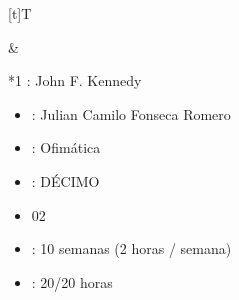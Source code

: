 \documentclass[letterpaper,10pt,spanish]{sphinxmanual}
\begin{document}
\begin{savenotes}\sphinxattablestart
\sphinxthistablewithglobalstyle
\centering
\begin{tabular}[t]{}
\sphinxtoprule
\sphinxtableatstartofbodyhook

\begin{savenotes}\sphinxattablestart
\sphinxthistablewithglobalstyle
\centering
\begin{tabulary}{\linewidth}[t]{T}
\sphinxtoprule
\sphinxtableatstartofbodyhook
\sphinxAtStartPar
{}
\\
\sphinxbottomrule
\end{tabulary}
\sphinxtableafterendhook\par
\sphinxattableend\end{savenotes}
&

\begin{savenotes}\sphinxattablestart
\sphinxthistablewithglobalstyle
\raggedright
\begin{tabular}[t]{*{1}{}}
\sphinxtoprule
\sphinxtableatstartofbodyhook
\sphinxAtStartPar
{}: John F. Kennedy
\begin{itemize}
\item {} 
\sphinxAtStartPar
{}: Julian Camilo Fonseca Romero

\item {} 
\sphinxAtStartPar
{}: Ofimática

\item {} 
\sphinxAtStartPar
{}: DÉCIMO

\item {} 
\sphinxAtStartPar
{} 02

\item {} 
\sphinxAtStartPar
{}: 10 semanas (2 horas / semana)

\item {} 
\sphinxAtStartPar
{}: 20/20 horas

\end{itemize}
\\
\sphinxbottomrule
\end{tabular}
\sphinxtableafterendhook\par
\sphinxattableend\end{savenotes}
\\
\sphinxbottomrule
\end{tabular}
\sphinxtableafterendhook\par
\sphinxattableend\end{savenotes}
\end{document}
